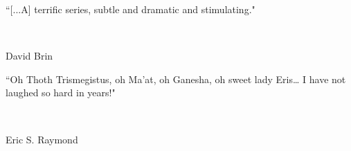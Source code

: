 \makeatletter
\newlength{\beforeblurbskip}
  \setlength{\beforeblurbskip}{.5\baselineskip}
\newlength{\afterblurbskip}
  \setlength{\afterblurbskip}{.5\baselineskip}
\newlength{\blurbwidth}
  \setlength{\blurbwidth}{.6\textwidth}
\newlength{\blurbrule}
  \setlength{\blurbrule}{.4\p@}
\newcommand{\blurbsize}{\small}
\newcommand{\blurbflush}{flushright}

\newcommand{\blurbfontsize}[1]{\def\blurbsize{#1}}
\newcommand{\blurbposition}[1]{\long\def\blurbflush{#1}}
\newcommand{\blurbtextposition}[1]{\def\textflush{#1}}
\newcommand{\blurbsourceposition}[1]{\def\sourceflush{#1}}

\newcommand{\@blurbrule}{\rule[.5ex]{\blurbwidth}{\blurbrule}}

\newcommand{\@blurbtext}[1]{%
  \begin{minipage}{\blurbwidth}\begin{\textflush} #1\par
    \ifdim\blurbrule>\z@ \@blurbrule \else \vspace*{1ex} \fi
  \end{\textflush}\end{minipage}}

  \newcommand{\@blurbsource}[1]{%
  \begin{minipage}{\blurbwidth}
    \begin{\sourceflush} #1\par
  \end{\sourceflush}\end{minipage}}

\newcommand{\blurb}[2]{
	\vspace{\beforeblurbskip}
	{\blurbsize
	\begin{\blurbflush}
		\begin{minipage}{8cm} \@blurbtext{#1}\\ \@blurbsource{#2} \end{minipage}
	\end{\blurbflush}
	\vspace{\afterblurbskip}}}
\makeatother

\thispagestyle{empty}
\blurb{``[...A] terrific series, subtle and dramatic and stimulating."}{David Brin}
\blurb{``Oh Thoth Trismegistus, oh Ma'at, oh Ganesha, oh sweet lady Eris{\ldots} I have not laughed so hard in years!"}{Eric S. Raymond}
\thispagestyle{empty}
